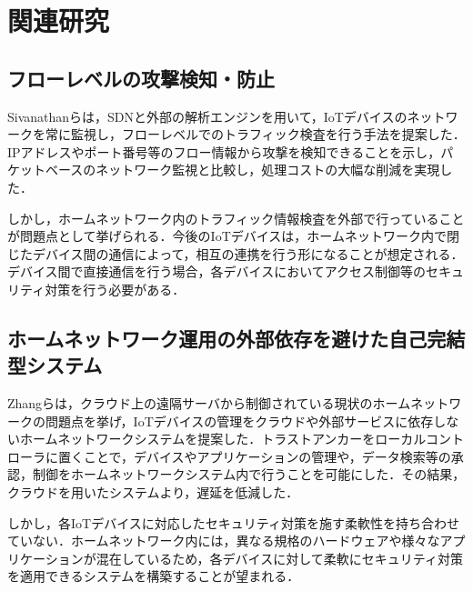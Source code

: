 \documentclass[Japanese]{dicomopapers}
\begin{document}


\section{関連研究}
\subsection{フローレベルの攻撃検知・防止}
Sivanathanらは，SDNと外部の解析エンジンを用いて，IoTデバイスのネットワークを常に監視し，フローレベルでのトラフィック検査を行う手法を提案した\cite{lowcost}．IPアドレスやポート番号等のフロー情報から攻撃を検知できることを示し，パケットベースのネットワーク監視と比較し，処理コストの大幅な削減を実現した．\par
しかし，ホームネットワーク内のトラフィック情報検査を外部で行っていることが問題点として挙げられる．今後のIoTデバイスは，ホームネットワーク内で閉じたデバイス間の通信によって，相互の連携を行う形になることが想定される\cite{d2d}．デバイス間で直接通信を行う場合，各デバイスにおいてアクセス制御等のセキュリティ対策を行う必要がある．


\subsection{ホームネットワーク運用の外部依存を避けた自己完結型システム}
Zhangらは，クラウド上の遠隔サーバから制御されている現状のホームネットワークの問題点を挙げ，IoTデバイスの管理をクラウドや外部サービスに依存しないホームネットワークシステムを提案した\cite{sover}．トラストアンカーをローカルコントローラに置くことで，デバイスやアプリケーションの管理や，データ検索等の承認，制御をホームネットワークシステム内で行うことを可能にした．その結果，クラウドを用いたシステムより，遅延を低減した．\par
しかし，各IoTデバイスに対応したセキュリティ対策を施す柔軟性を持ち合わせていない．ホームネットワーク内には，異なる規格のハードウェアや様々なアプリケーションが混在しているため，各デバイスに対して柔軟にセキュリティ対策を適用できるシステムを構築することが望まれる．
\end{document}
